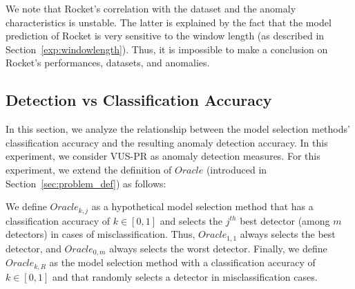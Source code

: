 We note that Rocket's correlation with the dataset and the anomaly characteristics is unstable. The latter is explained by the fact that the model prediction of Rocket is very sensitive to the window length (as described in Section~\ref{exp:windowlength}). Thus, it is impossible to make a conclusion on Rocket's performances, datasets, and anomalies.


\subsection{Detection vs Classification Accuracy}
\label{exp:detectionvsclass}

In this section, we analyze the relationship between the model selection methods' classification accuracy and the resulting anomaly detection accuracy. In this experiment, we consider VUS-PR as anomaly detection measures. For this experiment, we extend the definition of $Oracle$ (introduced in Section~\ref{sec:problem_def}) as follows:

\vspace{-0.1cm}
\begin{definition}
    We define $Oracle_{k,j}$ as a hypothetical model selection method that has a classification accuracy of $k \in [0,1]$ and selects the $j^{th}$ best detector (among $m$ detectors) in cases of misclassification. Thus, $Oracle_{1,1}$ always selects the best detector, and $Oracle_{0,m}$ always selects the worst detector. Finally, we define $Oracle_{k,R}$ as the model selection method with a classification accuracy of $k \in [0,1]$ and that randomly selects a detector in misclassification cases.
    \vspace{-0.1cm}
\end{definition}

